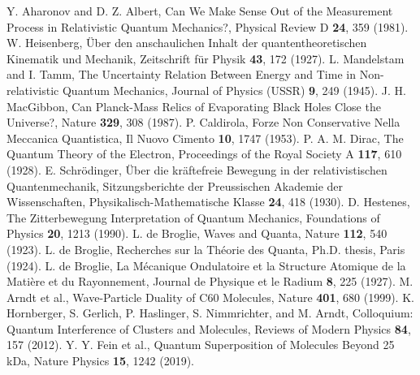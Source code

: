 \documentclass[12pt,a4paper]{article}
\begin{document}
\begin{thebibliography}{99}
		 Y. Aharonov and D. Z. Albert, Can We Make Sense Out of the Measurement Process in Relativistic Quantum Mechanics?, Physical Review D \textbf{24}, 359 (1981).
		 W. Heisenberg, Über den anschaulichen Inhalt der quantentheoretischen Kinematik und Mechanik, Zeitschrift für Physik \textbf{43}, 172 (1927).
		 L. Mandelstam and I. Tamm, The Uncertainty Relation Between Energy and Time in Non-relativistic Quantum Mechanics, Journal of Physics (USSR) \textbf{9}, 249 (1945).
		 J. H. MacGibbon, Can Planck-Mass Relics of Evaporating Black Holes Close the Universe?, Nature \textbf{329}, 308 (1987).
		 P. Caldirola, Forze Non Conservative Nella Meccanica Quantistica, Il Nuovo Cimento \textbf{10}, 1747 (1953).
		 P. A. M. Dirac, The Quantum Theory of the Electron, Proceedings of the Royal Society A \textbf{117}, 610 (1928).
		 E. Schrödinger, Über die kräftefreie Bewegung in der relativistischen Quantenmechanik, Sitzungsberichte der Preussischen Akademie der Wissenschaften, Physikalisch-Mathematische Klasse \textbf{24}, 418 (1930).
		 D. Hestenes, The Zitterbewegung Interpretation of Quantum Mechanics, Foundations of Physics \textbf{20}, 1213 (1990).
		 L. de Broglie, Waves and Quanta, Nature \textbf{112}, 540 (1923).
		 L. de Broglie, Recherches sur la Théorie des Quanta, Ph.D. thesis, Paris (1924).
		 L. de Broglie, La Mécanique Ondulatoire et la Structure Atomique de la Matière et du Rayonnement, Journal de Physique et le Radium \textbf{8}, 225 (1927).
		 M. Arndt et al., Wave-Particle Duality of C60 Molecules, Nature \textbf{401}, 680 (1999).
		 K. Hornberger, S. Gerlich, P. Haslinger, S. Nimmrichter, and M. Arndt, Colloquium: Quantum Interference of Clusters and Molecules, Reviews of Modern Physics \textbf{84}, 157 (2012).
		 Y. Y. Fein et al., Quantum Superposition of Molecules Beyond 25 kDa, Nature Physics \textbf{15}, 1242 (2019).
	\end{thebibliography}
	
\end{document}

